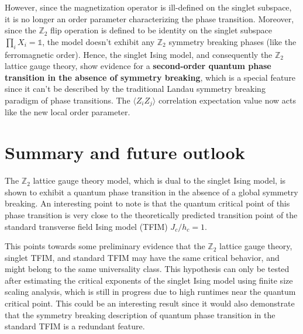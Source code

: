 \documentclass[../thesis_main.tex]{subfiles}
\begin{document}
However, since the magnetization operator is ill-defined on the singlet subspace, it is no longer an order parameter characterizing the phase transition. Moreover, since the $\mathbb{Z}_2$ flip operation is defined to be identity on the singlet subspace $\prod_i X_i = \mathds{1}$, the model doesn't exhibit any $\mathbb{Z}_2$ symmetry breaking phases (like the ferromagnetic order). Hence, the singlet Ising model, and consequently the $\mathbb{Z}_2$ lattice gauge theory, show evidence for a \textbf{second-order quantum phase transition in the absence of symmetry breaking}, which is a special feature since it can't be described by the traditional Landau symmetry breaking paradigm of phase transitions. The $\langle Z_i Z_j\rangle$ correlation expectation value now acts like the new local order parameter. 

\section{Summary and future outlook}
The $\mathbb{Z}_2$ lattice gauge theory model, which is dual to the singlet Ising model, is shown to exhibit a quantum phase transition in the absence of a global symmetry breaking. An interesting point to note is that the quantum critical point of this phase transition is very close to the theoretically predicted transition point of the standard transverse field Ising model (TFIM) $J_c/h_c = 1$. 

This points towards some preliminary evidence that the $\mathbb{Z}_2$ lattice gauge theory, singlet TFIM, and standard TFIM may have the same critical behavior, and might belong to the same universality class. This hypothesis can only be tested after estimating the critical exponents of the singlet Ising model using finite size scaling analysis, which is still in progress due to high runtimes near the quantum critical point. This could be an interesting result since it would also demonstrate that the symmetry breaking description of quantum phase transition in the standard TFIM is a redundant feature.
\end{document}

